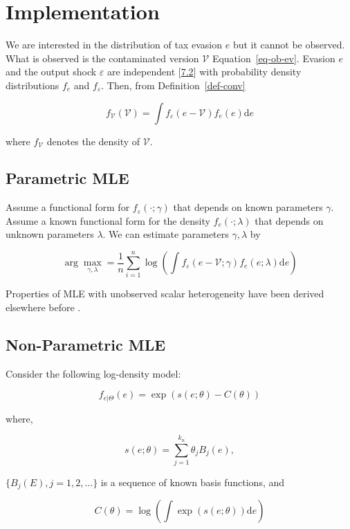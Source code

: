 \documentclass[
  12pt]{article}
\theoremstyle{definition}
\theoremstyle{remark}
\begin{document}
\section{Implementation}\label{implementation}

We are interested in the distribution of tax evasion \(e\) but it cannot
be observed. What is observed is the contaminated version
\(\mathcal{V}\) Equation~\ref{eq-ob-ev}. Evasion \(e\) and the output
shock \(\varepsilon\) are independent {[}\hyperref[ass-ind]{7.2}{]} with
probability density distributions \(f_e\) and \(f_{\varepsilon}\). Then,
from Definition~\ref{def-conv}

\[
f_{\mathcal{V}}(\mathcal{V})=\int f_{\varepsilon}(e-\mathcal{V})f_e(e)\text{d}e
\]

where \(f_{\mathcal{V}}\) denotes the density of \(\mathcal{V}\).

\subsection{Parametric MLE}\label{parametric-mle}

Assume a functional form for \(f_{\varepsilon}(\cdot;\gamma)\) that
depends on known parameters \(\gamma\). Assume a known functional form
for the density \(f_e(\cdot;\lambda)\) that depends on unknown
parameters \(\lambda\). We can estimate parameters \(\gamma, \lambda\)
by

\[
\arg \max_{\gamma,\lambda}=\frac{1}{n}\sum_{i=1}^n \log \left(\int f_{\varepsilon}(e-\mathcal{V};\gamma)f_e(e;\lambda)\text{d}e\right)
\]

Properties of MLE with unobserved scalar heterogeneity have been derived
elsewhere before \citep{Chen2007, Yi2021}.

\subsection{Non-Parametric MLE}\label{non-parametric-mle}

Consider the following log-density model:

\[
f_{e|\Theta}(e)=\exp(s(e;\theta)-C(\theta))
\]

where,

\[
s(e;\theta)=\sum_{j=1}^{k_n}\theta_j B_j(e),
\]

\(\{B_j(E), j=1,2,\dots\}\) is a sequence of known basis functions, and

\[
C(\theta) = \log\left(\int \exp(s(e;\theta)) \text{d}e \right)
\]
\end{document}
